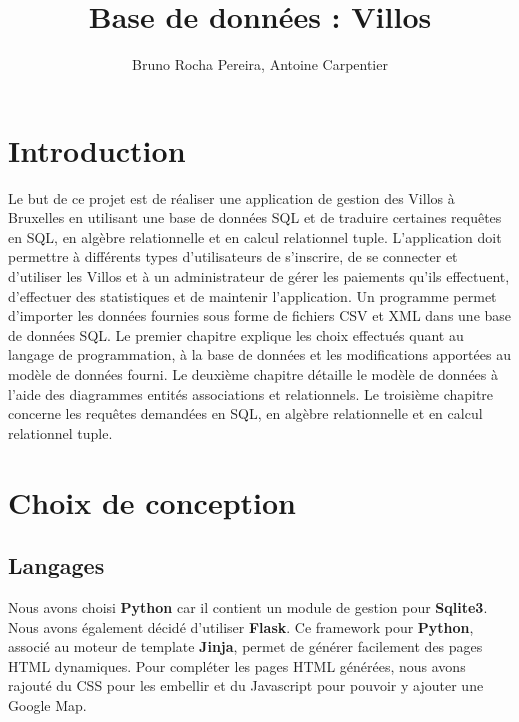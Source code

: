 \documentclass[a4paper,11pt]{report}
\author{Bruno Rocha Pereira, Antoine Carpentier}
\title{Base de données : Villos}
\begin{document}

\maketitle

\chapter{Introduction}

Le but de ce projet est de réaliser une application de gestion des Villos à Bruxelles en utilisant une base de données SQL et de traduire certaines requêtes en SQL, en algèbre relationnelle et en calcul relationnel tuple.
L'application doit permettre à différents types d'utilisateurs de s'inscrire, de se connecter et d'utiliser les Villos et à un administrateur de gérer les paiements qu'ils effectuent, d'effectuer des statistiques et de maintenir l'application.
Un programme permet d'importer les données fournies sous forme de fichiers CSV et XML dans une base de données SQL.
Le premier chapitre explique les choix effectués quant au langage de programmation, à la base de données et les modifications apportées au modèle de données fourni.
Le deuxième chapitre détaille le modèle de données à l'aide des diagrammes entités associations et relationnels.
Le troisième chapitre concerne les requêtes demandées en SQL, en algèbre relationnelle et en calcul relationnel tuple.

\chapter{Choix de conception}

\section{Langages}

Nous avons choisi \textbf{Python} car il contient un module de gestion pour \textbf{Sqlite3}. 
Nous avons également décidé d'utiliser \textbf{Flask}. Ce framework pour \textbf{Python}, associé au moteur de template \textbf{Jinja}, permet de générer facilement des pages HTML dynamiques. Pour compléter les pages HTML générées, nous avons rajouté du CSS pour les embellir et du Javascript pour pouvoir y ajouter une Google Map.
\end{document}
